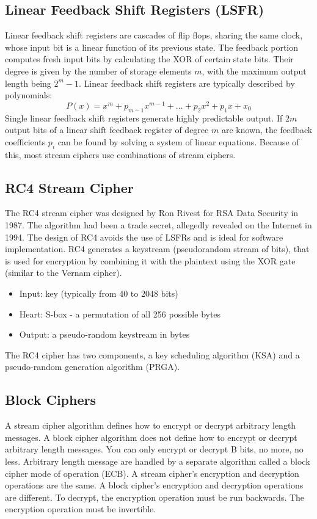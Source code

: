 \documentclass{math}
\begin{document}
\subsection*{Linear Feedback Shift Registers (LSFR)}
Linear feedback shift registers are cascades of flip flops, sharing the same
clock, whose input bit is a linear function of its previous state. The feedback
portion computes fresh input bits by calculating the XOR of certain state bits.
Their degree is given by the number of storage elements \( m \), with the
maximum output length being \( 2^m-1 \). Linear feedback shift registers are
typically described by polynomials:
\[ P(x) = x^m+p_{m-1}x^{m-1}+\dots+p_2x^2+p_1x+x_0 \]
Single linear feedback shift registers generate highly predictable output. If
\( 2m \) output bits of a linear shift feedback register of degree \( m \) are
known, the feedback coefficients \( p_i \) can be found by solving a system of
linear equations. Because of this, most stream ciphers use combinations of
stream ciphers.

\subsection*{RC4 Stream Cipher}
The RC4 stream cipher was designed by Ron Rivest for RSA Data Security in 1987.
The algorithm had been a trade secret, allegedly revealed on the Internet in
1994. The design of RC4 avoids the use of LSFRs and is ideal for software
implementation. RC4 generates a keystream (pseudorandom stream of bits), that is
used for encryption by combining it with the plaintext using the XOR gate
(similar to the Vernam cipher).
\begin{itemize}
  \item Input: key (typically from 40 to 2048 bits)
  \item Heart: S-box - a permutation of all 256 possible bytes
  \item Output: a pseudo-random keystream in bytes
\end{itemize}
The RC4 cipher has two components, a key scheduling algorithm (KSA) and a
pseudo-random generation algorithm (PRGA).

\subsection*{Block Ciphers}
A stream cipher algorithm defines how to encrypt or decrypt arbitrary length
messages. A block cipher algorithm does not define how to encrypt or decrypt
arbitrary length messages. You can only encrypt or decrypt B bits, no more, no
less. Arbitrary length message are handled by a separate algorithm called a
block cipher mode of operation (ECB). A stream cipher's encryption and
decryption operations are the same. A block cipher's encryption and decryption
operations are different. To decrypt, the encryption operation must be run
backwards. The encryption operation must be invertible.
\end{document}
